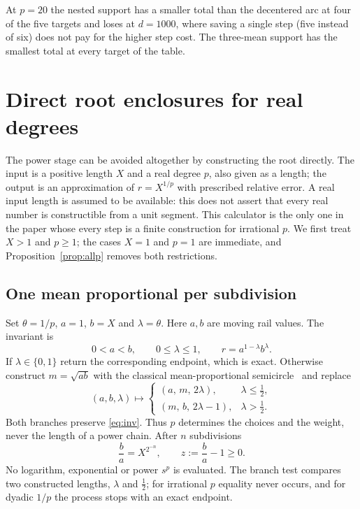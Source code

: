At $p=20$ the nested support has a smaller total than the decentered arc at four of the five targets
and loses at $d=1000$, where saving a single step (five instead of six) does not pay for the higher
step cost. The three-mean support has the smallest total at every target of the table.

\section{Direct root enclosures for real degrees}\label{sec:enclosure}

The power stage can be avoided altogether by constructing the root directly. The input is a positive
length $X$ and a real degree $p$, also given as a length; the output is an approximation of
$r=X^{1/p}$ with prescribed relative error. A real input length is assumed to be available: this does
not assert that every real number is constructible from a unit segment. This calculator is the only one in the paper whose every
step is a finite construction for irrational $p$. We first treat $X>1$ and $p\ge1$; the cases $X=1$ and
$p=1$ are immediate, and Proposition~\ref{prop:allp} removes both restrictions.

\subsection{One mean proportional per subdivision}

Set $\theta=1/p$, $a=1$, $b=X$ and $\lambda=\theta$. Here $a,b$ are moving rail values. The invariant is
\begin{equation}\label{eq:inv}
0<a<b,\qquad 0\le\lambda\le1,\qquad r=a^{1-\lambda}b^{\lambda}.
\end{equation}
If $\lambda\in\{0,1\}$ return the corresponding endpoint, which is exact. Otherwise construct
$m=\sqrt{ab}$ with the classical mean-proportional semicircle~\cite{euclid} and replace
\begin{equation}\label{eq:subdiv}
(a,b,\lambda)\longmapsto
\begin{cases}(a,\,m,\,2\lambda),&\lambda\le\tfrac12,\\[2pt](m,\,b,\,2\lambda-1),&\lambda>\tfrac12.\end{cases}
\end{equation}
Both branches preserve \eqref{eq:inv}. Thus $p$ determines the choices and the weight, never the length
of a power chain. After $n$ subdivisions
\begin{equation}\label{eq:gap}
\frac ba=X^{2^{-n}},\qquad z:=\frac ba-1\ge0.
\end{equation}
No logarithm, exponential or power $s^{p}$ is evaluated. The branch test compares two constructed
lengths, $\lambda$ and $\tfrac12$; for irrational $p$ equality never occurs, and for dyadic $1/p$ the
process stops with an exact endpoint.

